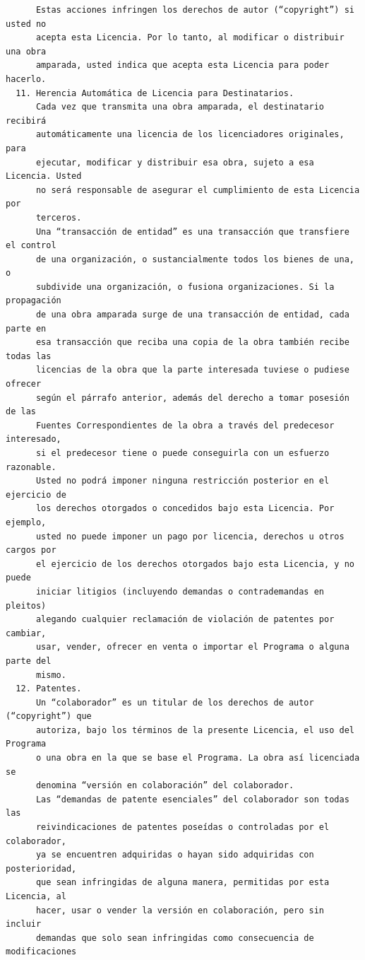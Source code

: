 \begin{verbatim}
      Estas acciones infringen los derechos de autor (“copyright”) si usted no
      acepta esta Licencia. Por lo tanto, al modificar o distribuir una obra
      amparada, usted indica que acepta esta Licencia para poder hacerlo.
  11. Herencia Automática de Licencia para Destinatarios.
      Cada vez que transmita una obra amparada, el destinatario recibirá
      automáticamente una licencia de los licenciadores originales, para
      ejecutar, modificar y distribuir esa obra, sujeto a esa Licencia. Usted
      no será responsable de asegurar el cumplimiento de esta Licencia por
      terceros.
      Una “transacción de entidad” es una transacción que transfiere el control
      de una organización, o sustancialmente todos los bienes de una, o
      subdivide una organización, o fusiona organizaciones. Si la propagación
      de una obra amparada surge de una transacción de entidad, cada parte en
      esa transacción que reciba una copia de la obra también recibe todas las
      licencias de la obra que la parte interesada tuviese o pudiese ofrecer
      según el párrafo anterior, además del derecho a tomar posesión de las
      Fuentes Correspondientes de la obra a través del predecesor interesado,
      si el predecesor tiene o puede conseguirla con un esfuerzo razonable.
      Usted no podrá imponer ninguna restricción posterior en el ejercicio de
      los derechos otorgados o concedidos bajo esta Licencia. Por ejemplo,
      usted no puede imponer un pago por licencia, derechos u otros cargos por
      el ejercicio de los derechos otorgados bajo esta Licencia, y no puede
      iniciar litigios (incluyendo demandas o contrademandas en pleitos)
      alegando cualquier reclamación de violación de patentes por cambiar,
      usar, vender, ofrecer en venta o importar el Programa o alguna parte del
      mismo.
  12. Patentes.
      Un “colaborador” es un titular de los derechos de autor (“copyright”) que
      autoriza, bajo los términos de la presente Licencia, el uso del Programa
      o una obra en la que se base el Programa. La obra así licenciada se
      denomina “versión en colaboración” del colaborador.
      Las “demandas de patente esenciales” del colaborador son todas las
      reivindicaciones de patentes poseídas o controladas por el colaborador,
      ya se encuentren adquiridas o hayan sido adquiridas con posterioridad,
      que sean infringidas de alguna manera, permitidas por esta Licencia, al
      hacer, usar o vender la versión en colaboración, pero sin incluir
      demandas que solo sean infringidas como consecuencia de modificaciones

\end{verbatim}
